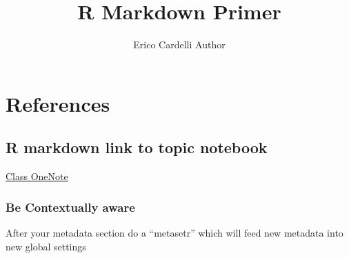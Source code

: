 \documentclass[]{article}
\title{R Markdown Primer}
\author{Erico Cardelli Author}
\date{}
\newenvironment{Shaded}{\begin{snugshade}}{\end{snugshade}}
\newcommand{\CommentTok}[1]{\textcolor[rgb]{0.56,0.35,0.01}{\textit{#1}}}
\newcommand{\DataTypeTok}[1]{\textcolor[rgb]{0.13,0.29,0.53}{#1}}
\newcommand{\KeywordTok}[1]{\textcolor[rgb]{0.13,0.29,0.53}{\textbf{#1}}}
\newcommand{\NormalTok}[1]{#1}
\newcommand{\OperatorTok}[1]{\textcolor[rgb]{0.81,0.36,0.00}{\textbf{#1}}}
\newcommand{\OtherTok}[1]{\textcolor[rgb]{0.56,0.35,0.01}{#1}}
\newcommand{\StringTok}[1]{\textcolor[rgb]{0.31,0.60,0.02}{#1}}
\begin{document}
\maketitle

{
\setcounter{tocdepth}{2}
\tableofcontents
}
\hypertarget{references}{%
\section{References}\label{references}}

\hypertarget{r-markdown-link-to-topic-notebook}{%
\subsection{R markdown link to topic
notebook}\label{r-markdown-link-to-topic-notebook}}

\href{https://onedrive.live.com/edit.aspx/Documents/Combined\%20Notes?cid=7e1da892b45794cd\&id=documents\&wd=target\%28Technical\%2FTraining.one\%7CE6348C5D-083C-4A40-8324-D42F0B525693\%2FR\%20Markdown\%20Primer\%7C6ED37784-C83D-4E14-B84B-54A6BCD399EC\%2F\%29\%20onenote:https://d.docs.live.net/7e1da892b45794cd/Documents/Combined\%20Notes/Technical/Training.one\#R\%20Markdown\%20Primer\&section-id=\%7BE6348C5D-083C-4A40-8324-D42F0B525693\%7D\&page-id=\%7B6ED37784-C83D-4E14-B84B-54A6BCD399EC\%7D\&end}{Class
OneNote}

\hypertarget{be-contextually-aware}{%
\subsubsection{Be Contextually aware}\label{be-contextually-aware}}

After your metadata section do a ``metasetr'' which will feed new
metadata into new global settings

\begin{Shaded}
\end{Shaded}
\end{document}
